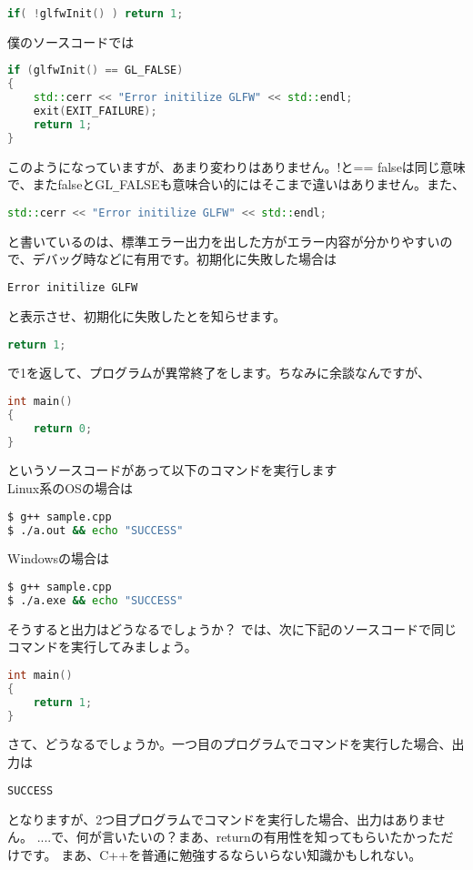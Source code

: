 \documentclass[a4paper,titlepage]{jsarticle}
\begin{document}
\begin{lstlisting}[language=C++]
if( !glfwInit() ) return 1;
\end{lstlisting}
僕のソースコードでは
\begin{lstlisting}[language=C++]
if (glfwInit() == GL_FALSE)
{
	std::cerr << "Error initilize GLFW" << std::endl;
	exit(EXIT_FAILURE);
	return 1;
}
\end{lstlisting}
このようになっていますが、あまり変わりはありません。!と== falseは同じ意味で、またfalseとGL\verb|_|FALSEも意味合い的にはそこまで違いはありません。また、
\begin{lstlisting}[language=C++]
std::cerr << "Error initilize GLFW" << std::endl;
\end{lstlisting}
と書いているのは、標準エラー出力を出した方がエラー内容が分かりやすいので、デバッグ時などに有用です。初期化に失敗した場合は
\begin{lstlisting}[language=bash]
Error initilize GLFW
\end{lstlisting}
と表示させ、初期化に失敗したとを知らせます。
\begin{lstlisting}[language=C++]
return 1;
\end{lstlisting}
で1を返して、プログラムが異常終了をします。ちなみに余談なんですが、
\begin{lstlisting}[caption = sample.cpp,language = C++]
int main()
{
	return 0;
}
\end{lstlisting}
というソースコードがあって以下のコマンドを実行します\\Linux系のOSの場合は
\begin{lstlisting}[language=bash]
$ g++ sample.cpp
$ ./a.out && echo "SUCCESS"
\end{lstlisting}
Windowsの場合は
\begin{lstlisting}[language=bash]
$ g++ sample.cpp
$ ./a.exe && echo "SUCCESS"
\end{lstlisting}
そうすると出力はどうなるでしょうか？
では、次に下記のソースコードで同じコマンドを実行してみましょう。
\begin{lstlisting}[caption = sample.cpp,language = C++]
int main()
{
	return 1;
}
\end{lstlisting}
さて、どうなるでしょうか。一つ目のプログラムでコマンドを実行した場合、出力は
\begin{lstlisting}[language=bash]
SUCCESS
\end{lstlisting}
となりますが、2つ目プログラムでコマンドを実行した場合、出力はありません。
....で、何が言いたいの？まあ、returnの有用性を知ってもらいたかっただけです。
まあ、C++を普通に勉強するならいらない知識かもしれない。
\end{document}
